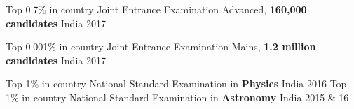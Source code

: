 
\begin{cvhonors}

  \cvhonor
    {Top 0.7\% in country}
    {Joint Entrance Examination Advanced, \textbf{160,000 candidates}} 
    {India} 
    {2017}

  \cvhonor
    {Top 0.001\% in country} 
    {Joint Entrance Examination Mains, \textbf{1.2 million candidates}} 
    {India}
    {2017}

 \cvhonor
    {Top 1\% in country} 
    {National Standard Examination in \textbf{Physics}}
    {India}
    {2016}
 \cvhonor
    {Top 1\% in country} 
    {National Standard Examination in \textbf{Astronomy}}
    {India}
    {2015 \& 16}

\end{cvhonors}